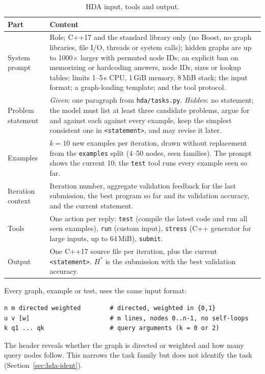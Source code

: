 \documentclass[11pt]{article}
\begin{document}
\begin{table}[h]
\centering
\small
\begin{tabular}{p{2.8cm}p{9.6cm}}
\toprule
Part & Content \\
\midrule
System prompt & Role; C++17 and the standard library only (no Boost, no graph
libraries, file I/O, threads or system calls); hidden graphs are up to 1000$\times$
larger with permuted node IDs; an explicit ban on memorizing or hardcoding
answers, node IDs, sizes or lookup tables; limits 1--5\,s CPU, 1\,GiB memory,
8\,MiB stack; the input format; a graph-loading template; and the tool protocol. \\
Problem statement & \emph{Given}: one paragraph from \texttt{hda/tasks.py}.
\emph{Hidden}: no statement; the model must list at least three candidate
problems, argue for and against each against every example, keep the simplest
consistent one in \texttt{<statement>}, and may revise it later. \\
Examples & $k=10$ new examples per iteration, drawn without replacement from the
\texttt{examples} split (4--50 nodes, seen families). The prompt shows the
current 10; the \texttt{test} tool runs every example seen so far. \\
Iteration context & Iteration number, aggregate validation feedback for the last
submission, the best program so far and its validation accuracy, and the
current statement. \\
Tools & One action per reply: \texttt{test} (compile the latest code and run all
seen examples), \texttt{run} (custom input), \texttt{stress} (C++ generator for
large inputs, up to 64\,MiB), \texttt{submit}. \\
Output & One C++17 source file per iteration, plus the current
\texttt{<statement>}. $H^*$ is the submission with the best validation accuracy. \\
\bottomrule
\end{tabular}
\caption{HDA input, tools and output.}
\label{tab:hda-protocol}
\end{table}

Every graph, example or test, uses the same input format:
\begin{verbatim}
n m directed weighted        # directed, weighted in {0,1}
u v [w]                      # m lines, nodes 0..n-1, no self-loops
k q1 ... qk                  # query arguments (k = 0 or 2)
\end{verbatim}
The header reveals whether the graph is directed or weighted and how many query
nodes follow. This narrows the task family but does not identify the task
(Section~\ref{sec:hda-ident}).
\end{document}

